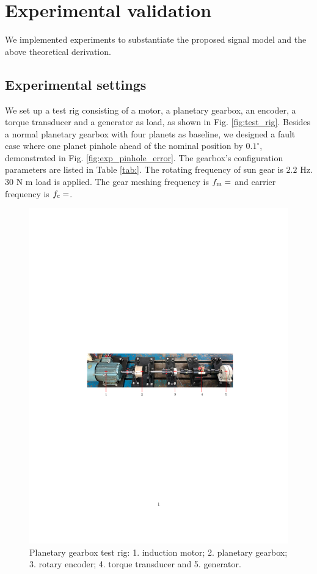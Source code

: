 \documentclass[a4paper,fleqn]{cas-sc}%
\begin{document}
\section{Experimental validation}
We implemented experiments to substantiate the proposed signal model and the above theoretical derivation.
\subsection{Experimental settings}
\par We set up a test rig consisting of a motor, a planetary gearbox, an encoder,  a torque transducer and a generator as load, as shown in Fig. \ref{fig:test_rig}. Besides a normal planetary gearbox with four planets as baseline,  we designed a fault case where one planet pinhole ahead of the nominal position by $0.1^{\circ}$, demonstrated in Fig. \ref{fig:exp_pinhole_error}. The gearbox's configuration parameters are listed in Table \ref{tab:}. The rotating frequency of sun gear is $2.2$ Hz. $30$ N m load is applied. The gear meshing frequency is $f_{\rm m}=$ and carrier frequency is $f_{\rm c}=$.
\begin{figure}[pos=htbp]
    \centering
    \includegraphics{test_rig_configuration.pdf}
    \caption{Planetary gearbox test rig: 1. induction motor; 2. planetary gearbox; 3. rotary encoder; 4. torque transducer and 5. generator.}
    \label{fig:tets_rig}
\end{figure} 
\end{document}
